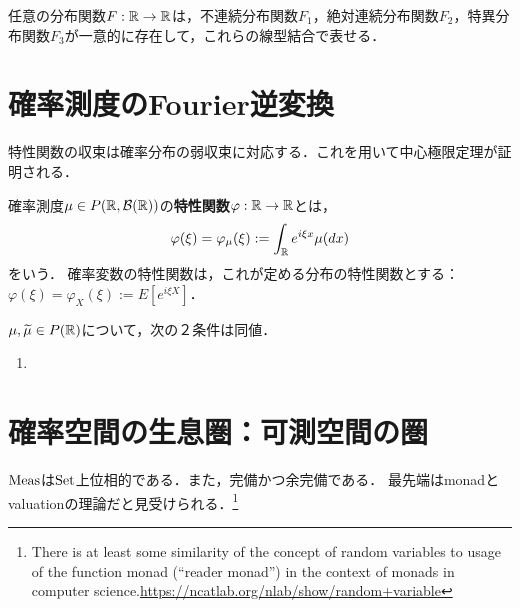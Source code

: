 \documentclass[uplatex,dvipdfmx]{jsreport}
\begin{document}
\begin{theorem}
    任意の分布関数$F:\mathbb{R}\to\mathbb{R}$は，不連続分布関数$F_1$，絶対連続分布関数$F_2$，特異分布関数$F_3$が一意的に存在して，これらの線型結合で表せる．
\end{theorem}

\section{確率測度のFourier逆変換}

\begin{tcolorbox}[colframe=ForestGreen, colback=ForestGreen!10!white,breakable,colbacktitle=ForestGreen!40!white,coltitle=black,fonttitle=\bfseries\sffamily,
title=]
    特性関数の収束は確率分布の弱収束に対応する．これを用いて中心極限定理が証明される．
\end{tcolorbox}

\begin{definition}
    確率測度$\mu\in P(\mathbb{R},\mathcal{B}(\mathbb{R}))$の\textbf{特性関数}$\varphi:\mathbb{R}\to\mathbb{R}$とは，
    \[\varphi(\xi)=\varphi_\mu(\xi):=\int_{\mathbb{R}} e^{i\xi x}\mu(dx)\]
    をいう．
    確率変数の特性関数は，これが定める分布の特性関数とする：$\varphi(\xi)=\varphi_X(\xi):=E[e^{i\xi X}]$．
\end{definition}

\begin{theorem}
    $\mu,\widetilde{\mu}\in P(\mathbb{R})$について，次の２条件は同値．
    \begin{enumerate}
        \item 
    \end{enumerate}
\end{theorem}

\section{確率空間の生息圏：可測空間の圏}

\begin{tcolorbox}[colframe=ForestGreen, colback=ForestGreen!10!white,breakable,colbacktitle=ForestGreen!40!white,coltitle=black,fonttitle=\bfseries\sffamily,
title=]
    $\mathrm{Meas}$は$\mathrm{Set}$上位相的である．また，完備かつ余完備である．
    最先端はmonadとvaluationの理論だと見受けられる．\footnote{There is at least some similarity of the concept of random variables to usage of the function monad (“reader monad”) in the context of monads in computer science.\url{https://ncatlab.org/nlab/show/random+variable}}
\end{tcolorbox}
\end{document}
